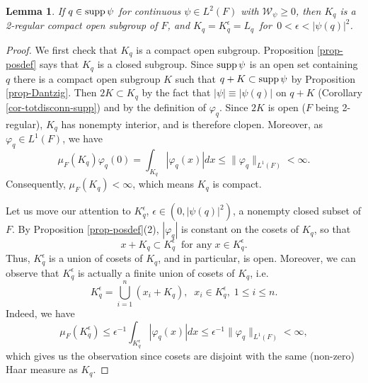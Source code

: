 \documentclass[12pt,reqno]{amsart}
\newtheorem{lem}[thm]{Lemma}
\theoremstyle{definition}
\theoremstyle{definition}
\theoremstyle{definition}
\numberwithin{thm}{section}
\numberwithin{equation}{section}
\newcommand{\vphi}{\varphi}
\begin{document}
\begin{lem} \label{lem-totdisconn-threesets}
If $q\in {\rm supp}\,\psi$ for continuous $\psi \in L^2(F)$ with $\mathcal{W}_{\psi}\geq 0$, then $K_q$ is a 2-regular compact open subgroup of $F$, and $K_q=K_q^{\epsilon}=L_q\,$ for $\,0<\epsilon< |\psi(q)|^2$.
\end{lem}
\begin{proof}
We first check that $K_q$ is a compact open subgroup. Proposition \ref{prop-posdef} says that $K_q$ is a closed subgroup. Since ${\rm supp}\,\psi$ is an open set containing $q$ there is a compact open subgroup $K$ such that $q+K\subset {\rm supp}\,\psi$ by Proposition \ref{prop-Dantzig}. Then $2K\subset K_q$ by the fact that $|\psi| \equiv |\psi(q)|$ on $q+K$ (Corollary \ref{cor-totdisconn-supp}) and by the definition of $\varphi_q$. Since $2K$ is open ($F$ being 2-regular), $K_q$ has nonempty interior, and is therefore clopen. Moreover, as $\varphi_q\in L^1(F)$, we have
    $$\mu_F(K_q)\varphi_q(0)=\int_{K_q}|\varphi_q(x)|dx\leq \|\varphi_q\|_{L^1(F)}<\infty.$$
Consequently, $\mu_F(K_q) <\infty$, which means $K_q$ is compact.



Let us move our attention to $K_q^{\epsilon}$, $\epsilon\in (0,|\psi(q)|^2)$, a nonempty closed subset of $F$. By Proposition \ref{prop-posdef}(2), $|\vphi_q|$ is constant on the cosets of $K_q$, so that
    \begin{equation}\label{eq-KqKqepsilon}
        x+K_q\subset K_q^{\epsilon}\;\;\text{for any}\; x\in K_q^{\epsilon}.
    \end{equation}
Thus, $K_q^{\epsilon}$ is a union of cosets of $K_q$, and in particular, is open. Moreover, we can observe that $K_q^{\epsilon}$ is actually a finite union of cosets of $K_q$, i.e.
\begin{equation}\label{eq-Kq}
    K_q^{\epsilon}=\bigcup_{i=1}^n(x_i+K_q),\;\; x_i \in K_q^\epsilon,\; 1\le i\le n.
\end{equation}
Indeed, we have
    $$\mu_F(K_q^{\epsilon})\leq \epsilon^{-1}\int _{K_q^{\epsilon}}|\varphi_q(x)|dx\leq \epsilon^{-1}\|\varphi_q\|_{L^1(F)}<\infty,$$
which gives us the observation since cosets are disjoint with the same (non-zero) Haar measure as $K_q$.


\end{proof}
\end{document}
